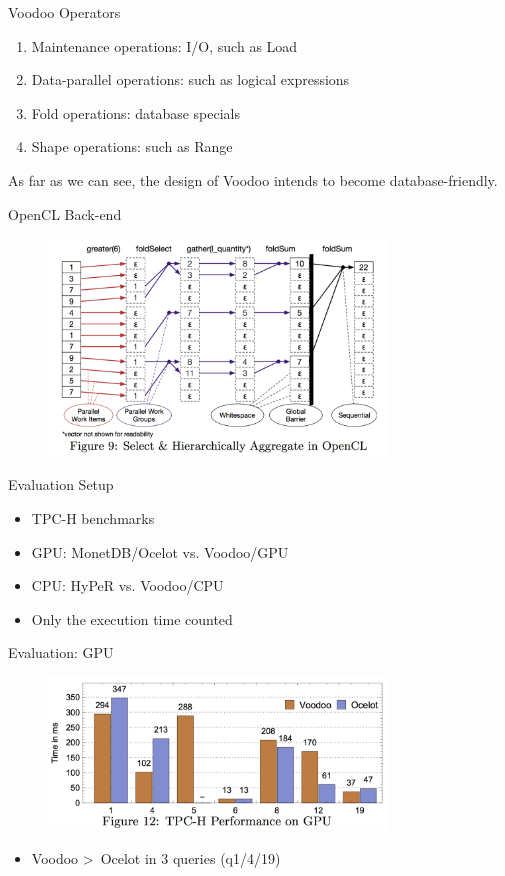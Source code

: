 \begin{frame}{Voodoo Operators}
\begin{enumerate}
\item Maintenance operations: I/O, such as Load
\item Data-parallel operations: such as logical expressions
\item Fold operations: database specials
\item Shape operations: such as Range
\end{enumerate}

As far as we can see, the design of Voodoo intends to become database-friendly.
\end{frame}

\begin{frame}{OpenCL Back-end}
\begin{figure}[htb]
\includegraphics[width=0.8\textwidth]{fig/voodoo-fig9.png}
\end{figure}
\end{frame}

\begin{frame}{Evaluation}
Setup
\begin{itemize}
\item TPC-H benchmarks
\item GPU: MonetDB/Ocelot vs. Voodoo/GPU
\item CPU: HyPeR vs. Voodoo/CPU
\item Only the execution time counted
\end{itemize}
\end{frame}

\begin{frame}{Evaluation: GPU}
\begin{figure}[htb]
\includegraphics[width=0.8\textwidth]{fig/voodoo-fig12.png}
\end{figure}
\begin{itemize}
\item Voodoo \textgreater\ Ocelot in 3 queries (q1/4/19)
\end{itemize} 
\end{frame}

